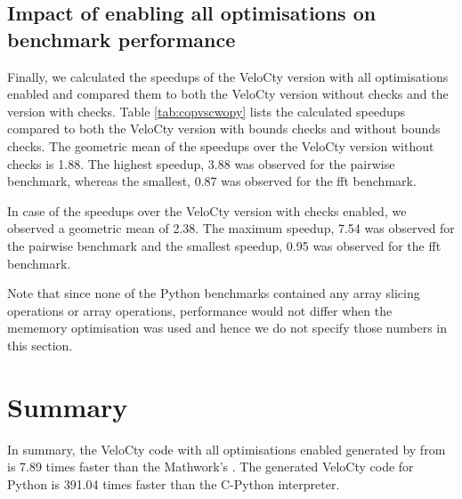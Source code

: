 \subsection{Impact of enabling all optimisations on benchmark performance}
Finally, we calculated the speedups of the VeloCty version with all optimisations enabled and compared them to both the VeloCty version without checks and the version with checks. Table \ref{tab:copvscwopy} lists the calculated speedups compared to both the VeloCty version with bounds checks and without bounds checks. The geometric mean of the speedups over the VeloCty version without checks is 1.88. The highest speedup, 3.88 was observed for the pairwise benchmark, whereas the smallest, 0.87 was observed for the fft benchmark. 

In case of the speedups over the VeloCty version with checks enabled, we observed a geometric mean of 2.38. The maximum speedup, 7.54 was observed for the pairwise benchmark and the smallest speedup, 0.95 was observed for the fft benchmark. 

Note that since none of the Python benchmarks contained any array slicing operations or array operations, performance would not differ when the mememory optimisation was used and hence we do not specify those numbers in this section. 
\section{Summary}
In summary, the VeloCty code with all optimisations enabled generated by \velocty from \matlab is 7.89 times faster than the Mathwork's \matlab. The generated VeloCty code for Python is 391.04 times faster than the C-Python interpreter.  

